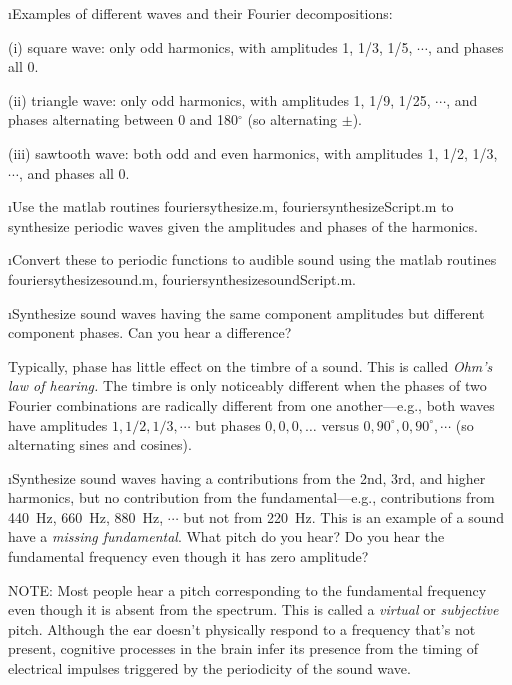 \i Examples of different waves and their Fourier
decompositions:

(i) square wave: only odd harmonics, with 
amplitudes 1, 1/3, 1/5, $\cdots$, and 
phases all 0.

(ii) triangle wave: only odd harmonics, with
amplitudes 1, 1/9, 1/25, $\cdots$, and 
phases alternating between 0 and 180$^\circ$ 
(so alternating $\pm$).

(iii) sawtooth wave: both odd and even harmonics, with 
amplitudes 1, 1/2, 1/3, $\cdots$, and 
phases all 0.

\i \demo Use the matlab routines
fouriersythesize.m, fouriersynthesizeScript.m to 
synthesize periodic waves given the amplitudes and
phases of the harmonics.

\i \demo Convert these to periodic functions to
audible sound using the matlab routines
fouriersythesizesound.m, fouriersynthesizesoundScript.m.

\i \demo Synthesize sound waves having the same
component amplitudes but different component phases.
Can you hear a difference?

Typically, phase has little effect on the timbre of a 
sound.
This is called {\em Ohm's law of hearing.}
The timbre is only noticeably different 
when the phases of two Fourier combinations 
are radically different from one another---e.g.,
both waves have amplitudes $1, 1/2, 1/3, \cdots$ 
but phases $0, 0, 0, \dots$ 
versus $0, 90^\circ, 0, 90^\circ, \cdots$ (so alternating
sines and cosines).
 
\i \demo Synthesize sound waves having a contributions
from the 2nd, 3rd, and higher harmonics, but no contribution
from the fundamental---e.g., 
contributions from 440~Hz, 660~Hz, 880~Hz, $\cdots$ 
but not from 220~Hz.
This is an example of a sound have a 
{\em missing fundamental}.
What pitch do you hear?
Do you hear the fundamental frequency even though it 
has zero amplitude?

NOTE: Most people hear a pitch corresponding to the 
fundamental frequency even though it is absent from 
the spectrum.
This is called a {\em virtual} or {\em subjective} pitch.
Although the ear doesn't physically respond to a 
frequency that's not present, cognitive processes in the 
brain infer its presence from the timing of electrical 
impulses triggered by the periodicity of the sound wave.

\ei
